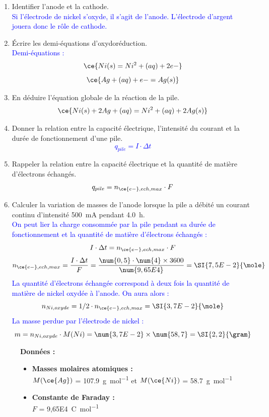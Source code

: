 \documentclass[a4paper,11pt,fleqn]{article}%
\begin{document}
\begin{enumerate}
    \item Identifier l'anode et la cathode.\\
    \textcolor{blue}{Si l'électrode de nickel s'oxyde, il s'agit de l'anode. L'électrode d'argent jouera donc le rôle de cathode.}
    \item Écrire les demi-équations d'oxydoréduction.\\
    \textcolor{blue}{Demi-équations : $$\ce{Ni(s) = Ni^2+(aq) + 2e-}$$ $$\ce{Ag+(aq) + e- = Ag(s)}$$}
    \item En déduire l'équation globale de la réaction de la pile.\\
    \textcolor{blue}{$$\ce{Ni(s) + 2Ag+(aq) = Ni^2+(aq) + 2Ag(s)}$$}
    \item Donner la relation entre la capacité électrique, l'intensité du courant et la durée de fonctionnement d'une pile.\\
    \textcolor{blue}{$$q_{pile} = I \cdot \Delta t$$}
    \item Rappeler la relation entre la capacité électrique et la quantité de matière d'électrons échangés.\\
    \textcolor{blue}{$$q_{pile} = n_{\ce{e-},ech,max} \cdot F$$}
    \item Calculer la variation de masses de l'anode lorsque la pile a débité un courant continu d'intensité \SI{500}{\milli\ampere} pendant \SI{4,0}{\hour}.\\
    \textcolor{blue}{On peut lier la charge consommée par la pile pendant sa durée de fonctionnement et la quantité de matière d'électrons échangés : $$I \cdot \Delta t = n_{\ce{e-},ech,max} \cdot F$$
    $$n_{\ce{e-},ech,max} = \dfrac{I \cdot \Delta t}{F} = \dfrac{\num{0,5} \cdot \num{4} \times 3600}{\num{9,65E4}}  = \SI{7,5E-2}{\mole}$$
    La quantité d'électrons échangée correspond à deux fois la quantité de matière de nickel oxydée à l'anode. On aura alors : $$n_{Ni, oxyde} = 1/2 \cdot n_{\ce{e-},ech,max} = \SI{3,7E-2}{\mole}$$
    La masse perdue par l'électrode de nickel : $$ m = n_{Ni, oxyde} \cdot M(Ni) = \num{3,7E-2} \times \num{58,7} = \SI{2,2}{\gram}$$}
\end{enumerate}

\begin{figure}[H]
    \begin{minipage}{\linewidth}
     \textbf{Données :}
     \begin{itemize}
        \item \textbf{Masses molaires atomiques :}\\
        $M(\ce{Ag})$ = \SI{107,9}{\gram\per\mole} et $M(\ce{Ni})$ = \SI{58,7}{\gram\per\mole}
        \item \textbf{Constante de Faraday :}\\ $F$ = \SI{9,65E4}{\coulomb\per\mole}
    \end{itemize}
    \end{minipage}
\end{figure}
\end{document}
